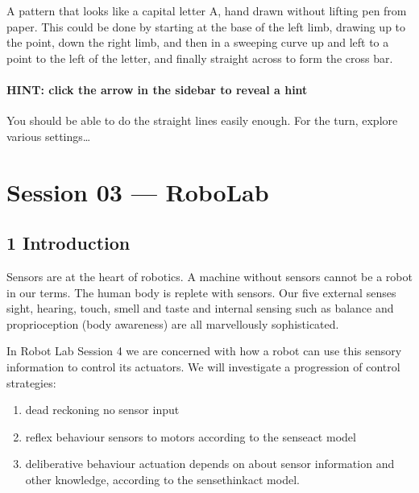 \documentclass[letterpaper,10pt,english]{sphinxmanual}
\let\sphinxpxdimen\pdfpxdimen\else\newdimen\sphinxpxdimen
\begin{document}
\sphinxincludegraphics[width=98\sphinxpxdimen,height=125\sphinxpxdimen]{{tm129_rob_p3_f025}.gif}

A pattern that looks like a capital letter A, hand drawn without lifting pen from paper. This could be done by starting at the base of the left limb, drawing up to the point, down the right limb, and then in a sweeping curve up and left to a point to the left of the letter, and finally straight across to form the cross bar.


\paragraph{HINT: click the arrow in the sidebar to reveal a hint}
\label{\detokenize{content/02_Robot_Lab/Section_00_04:id2}}
You should be able to do the straight lines easily enough. For the turn, explore various  settings…


\section{Session 03 — RoboLab}
\label{\detokenize{index:session-03-robolab}}

\subsection{1 Introduction}
\label{\detokenize{content/03_Robot_Lab/Section_00_01:1-Introduction}}\label{\detokenize{content/03_Robot_Lab/Section_00_01::doc}}
Sensors are at the heart of robotics. A machine without sensors cannot be a robot in our terms. The human body is replete with sensors. Our five external senses \textendash{} sight, hearing, touch, smell and taste \textendash{} and internal sensing such as balance and proprioception (body awareness) are all marvellously sophisticated.

In Robot Lab Session 4 we are concerned with how a robot can use this sensory information to control its actuators. We will investigate a progression of control strategies:
\begin{enumerate}
%
\item {} 
dead reckoning \textendash{} no sensor input

\item {} 
reflex behaviour \textendash{} sensors  to motors according to the sense\textendash{}act model

\item {} 
deliberative behaviour \textendash{} actuation depends on  about sensor information and other knowledge, according to the sense\textendash{}think\textendash{}act model.

\end{enumerate}
\end{document}
